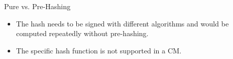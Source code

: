 \begin{minipage}[t]{0.28\textwidth}
\begin{algorithmbox}{Pure vs. Pre-Hashing}
\begin{itemize}[leftmargin=*]
\begin{itemize}[leftmargin=*]
                \item The hash needs to be signed with different algorithms and would be computed repeatedly without pre-hashing.
                \item The specific hash function is not supported in a CM.
            \end{itemize}
        \end{itemize}
        \vspace{0.75mm}
    \end{algorithmbox}
\end{minipage}

